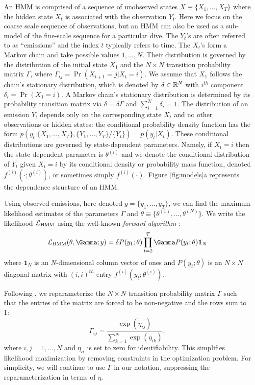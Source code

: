 An HMM is comprised of a sequence of unobserved states $X \equiv \big\{X_1, \ldots, X_T\big\}$ where the hidden state $X_t$ is associated with the observation $Y_t$. Here we focus on the coarse scale sequence of observations, but an HMM can also be used as a sub-model of the fine-scale sequence for a particular dive. The $Y_t$'s are often referred to as ``emissions'' and the index $t$ typically refers to time. 
The $X_t$'s form a Markov chain and take possible values $1, \ldots, N$. Their distribution is governed by the distribution of the initial state $X_1$ and the $N \times N$ transition probability matrix $\Gamma$, where $\Gamma_{ij} = \Pr(X_{t+1} = j | X_t = i)$. 
%
We assume that $X_1$ follows the chain's stationary distribution, which is denoted by $\delta \in \mathbb{R}^N$ with $i^{th}$ component
$\delta_i = \Pr(X_1 = i).$
A Markov chain's stationary distribution is determined by its probability transition matrix via $\delta = \delta \Gamma$ and $\sum_{i=1}^N \delta_i = 1$.
%
The distribution of an emission $Y_t$ depends only on the corresponding state $X_t$ and no other observations or hidden states: the conditional probability density function has the form $p\left(y_t|\{X_1,\ldots, X_T\},\{Y_1,\ldots, Y_T\}/ \{Y_t\}\right) = p(y_t|X_t)$.
%
These conditional distributions are governed by state-dependent parameters. Namely, if $X_t = i$ then the state-dependent parameter is $\theta^{(i)}$ and we denote the conditional distribution of $Y_t$ given $X_t=i$ by its conditional density or probability mass function, denoted $f^{(i)}(\cdot ; \theta^{(i)})$, or sometimes simply $f^{(i)}(\cdot)$.
%
Figure \ref{fig:models}a represents the dependence structure of an HMM.

Using observed emissions, here denoted $y = \{y_1,\ldots,y_T\}$, we can find the maximum likelihood estimates of the parameters $\Gamma$ and $\theta \equiv \{\theta^{(1)},\ldots,\theta^{(N)}\}$. We write the likelihood $\mathcal{L}_{\text{HMM}}$ using the  well-known \textit{forward algorithm} \citep{Zucchini:2016}:
%
$$\calL_{\text{HMM}}(\theta,\Gamma;y) = \delta P(y_1;\theta) \prod_{t=2}^T \Gamma P(y_t;\theta) \mathbf{1}_N$$
%
where $\mathbf{1}_N$ is an $N$-dimensional column vector of ones and
%
$P(y_t;\theta)$ is an $N \times N$ diagonal matrix with $(i,i)^{th}$ entry  $f^{(i)}(y_t; \theta^{(i)})$.
%

Following \citet{Barajas:2017}, we reparameterize the $N \times N$ transition probability matrix $\Gamma$ such that the entries of the matrix are forced to be non-negative and the rows sum to 1:
%
\[
\Gamma_{ij} = \frac{\exp(\eta_{ij})}{\sum_{k=1}^N \exp(\eta_{ik})}, 
\]
%
where $i,j = 1,\ldots,N$ and $\eta_{ii}$ is set to zero for identifiability. This simplifies likelihood maximization by removing constraints in the optimization problem. For simplicity, we will continue to use $\Gamma$ in our notation, suppressing the reparameterization in terms of $\eta$.

